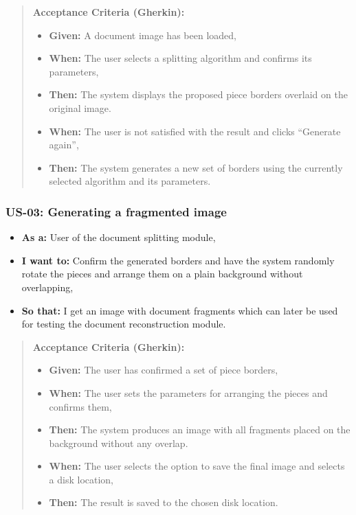 \documentclass[
]{article}
\providecommand{\tightlist}{%
  \setlength{\itemsep}{0pt}\setlength{\parskip}{0pt}}
\begin{document}
\begin{quote}
\textbf{Acceptance Criteria (Gherkin):}

\begin{itemize}
\tightlist
\item
  \textbf{Given:} A document image has been loaded,
\item
  \textbf{When:} The user selects a splitting algorithm and confirms its
  parameters,
\item
  \textbf{Then:} The system displays the proposed piece borders overlaid
  on the original image.
\item
  \textbf{When:} The user is not satisfied with the result and clicks
  ``Generate again'',
\item
  \textbf{Then:} The system generates a new set of borders using the
  currently selected algorithm and its parameters.
\end{itemize}
\end{quote}

\subsubsection{\texorpdfstring{\textbf{US-03: Generating a fragmented
image}}{US-03: Generating a fragmented image}}\label{us-03-generating-a-fragmented-image}

\begin{itemize}
\tightlist
\item
  \textbf{As a:} User of the document splitting module,
\item
  \textbf{I want to:} Confirm the generated borders and have the system
  randomly rotate the pieces and arrange them on a plain background
  without overlapping,
\item
  \textbf{So that:} I get an image with document fragments which can
  later be used for testing the document reconstruction module.
\end{itemize}

\begin{quote}
\textbf{Acceptance Criteria (Gherkin):}

\begin{itemize}
\tightlist
\item
  \textbf{Given:} The user has confirmed a set of piece borders,
\item
  \textbf{When:} The user sets the parameters for arranging the pieces
  and confirms them,
\item
  \textbf{Then:} The system produces an image with all fragments placed
  on the background without any overlap.
\item
  \textbf{When:} The user selects the option to save the final image and
  selects a disk location,
\item
  \textbf{Then:} The result is saved to the chosen disk location.
\end{itemize}
\end{quote}
\end{document}
